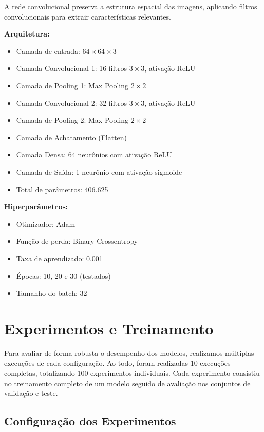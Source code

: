 \documentclass[a4paper,12pt]{article}
\begin{document}
A rede convolucional preserva a estrutura espacial das imagens, aplicando filtros convolucionais para extrair características relevantes.

\textbf{Arquitetura:}
\begin{itemize}
    \item Camada de entrada: $64 \times 64 \times 3$
    \item Camada Convolucional 1: 16 filtros $3 \times 3$, ativação ReLU
    \item Camada de Pooling 1: Max Pooling $2 \times 2$
    \item Camada Convolucional 2: 32 filtros $3 \times 3$, ativação ReLU
    \item Camada de Pooling 2: Max Pooling $2 \times 2$
    \item Camada de Achatamento (Flatten)
    \item Camada Densa: 64 neurônios com ativação ReLU
    \item Camada de Saída: 1 neurônio com ativação sigmoide
    \item Total de parâmetros: 406.625
\end{itemize}

\textbf{Hiperparâmetros:}
\begin{itemize}
    \item Otimizador: Adam
    \item Função de perda: Binary Crossentropy
    \item Taxa de aprendizado: 0.001
    \item Épocas: 10, 20 e 30 (testados)
    \item Tamanho do batch: 32
\end{itemize}

\section{Experimentos e Treinamento}
\label{sec:experimentos}

Para avaliar de forma robusta o desempenho dos modelos, realizamos múltiplas execuções de cada configuração. Ao todo, foram realizadas 10 execuções completas, totalizando 100 experimentos individuais. Cada experimento consistiu no treinamento completo de um modelo seguido de avaliação nos conjuntos de validação e teste.

\subsection{Configuração dos Experimentos}
\end{document}
